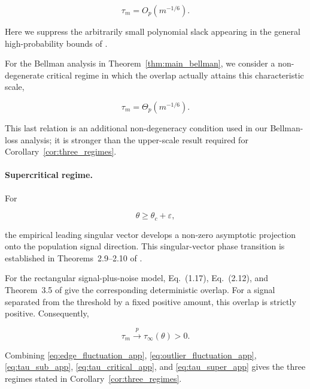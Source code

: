 \begin{equation}
\tau_m
=
O_p(m^{-1/6}).
\label{eq:tau_critical_app}
\end{equation}

Here we suppress the arbitrarily small polynomial slack appearing in the
general high-probability bounds of \cite{ding2020high}.

For the Bellman analysis in Theorem~\ref{thm:main_bellman}, we consider a
non-degenerate critical regime in which the overlap actually attains this
characteristic scale,

\begin{equation}
\tau_m
=
\Theta_p(m^{-1/6}).
\label{eq:tau_critical_nondegenerate}
\end{equation}

This last relation is an additional non-degeneracy condition used in our
Bellman-loss analysis; it is stronger than the upper-scale result required
for Corollary~\ref{cor:three_regimes}.


\paragraph{Supercritical regime.}

For

\begin{equation}
\theta
\geq
\theta_c+\varepsilon,
\end{equation}

the empirical leading singular vector develops a non-zero asymptotic
projection onto the population signal direction. This singular-vector
phase transition is established in Theorems~2.9--2.10 of
\cite{benaych2012singular}.

For the rectangular signal-plus-noise model, Eq.~(1.17),
Eq.~(2.12), and Theorem~3.5 of \cite{ding2020high} give the
corresponding deterministic overlap. For a signal separated from the
threshold by a fixed positive amount, this overlap is strictly positive.
Consequently,

\begin{equation}
\tau_m
\xrightarrow{p}
\tau_\infty(\theta)>0.
\label{eq:tau_super_app}
\end{equation}

Combining
\eqref{eq:edge_fluctuation_app},
\eqref{eq:outlier_fluctuation_app},
\eqref{eq:tau_sub_app},
\eqref{eq:tau_critical_app}, and
\eqref{eq:tau_super_app}
gives the three regimes stated in
Corollary~\ref{cor:three_regimes}.




